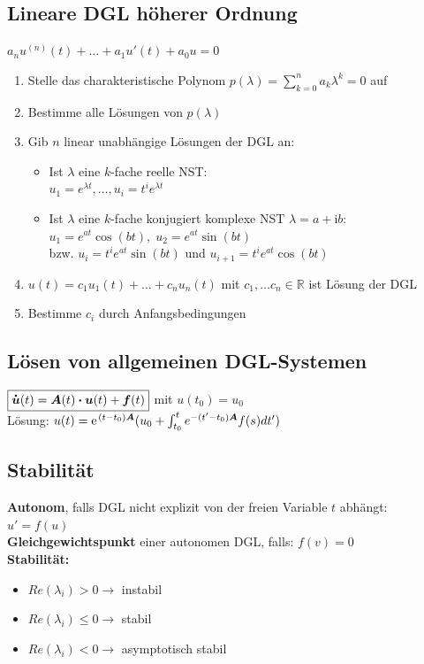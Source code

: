 \documentclass[6pt,a4paper]{scrartcl}
\newcommand{\ma}[1]{\ensuremath{\boldsymbol {#1}}}												%
\newcommand{\bdot}{\ensuremath{\boldsymbol \cdot}} 												%
\renewcommand{\vec}[1]{\ensuremath{\boldsymbol {#1}}}											%
\renewcommand*{\dot}[1]{\accentset{\mbox{\textrm{\large\bfseries .}} }{#1}}						%
\newcommand{\ra}[0]{\ensuremath{\rightarrow}} 									%
\renewcommand{\i}{\ensuremath{\mathrm{i}}}										%
\newcommand{\R}{\ensuremath{\mathbb R}}
\begin{document}
\begin{multicols*}{4}
\subsection{Lineare DGL höherer Ordnung}
$\boxed{a_nu^{(n)}(t) + \hdots + a_1u'(t)+a_0u = 0}$\\
\begin{enumerate}\itemsep0pt 
	\item Stelle das charakteristische Polynom $p(\lambda) = \sum^n_{k=0} a_k \lambda^k = 0$ auf
	\item Bestimme alle Lösungen von $p(\lambda)$
	\item Gib $n$ linear unabhängige Lösungen der DGL an:
	\begin{itemize}\itemsep0pt 
		\item 	Ist $ \lambda$ eine $k$-fache reelle NST:\\
$u_1 = e^{\lambda t}, \hdots, u_i = t^i e^{ \lambda t}$\\
		\item Ist $ \lambda$ eine $k$-fache konjugiert komplexe NST $\lambda = a + \i b$:\\
$u_1 = e^{at} \cos (bt),\; u_2 = e^{at} \sin (bt)$ \\
bzw. $u_i = t^i e^{at} \sin (bt)$ und $u_{i+1} =  t^i e^{at} \cos (bt)$
	\end{itemize}
	\item $u(t) = c_1 u_1 (t) + \ldots + c_n u_n (t)$ mit $c_1, \ldots c_n \in \R$ ist Lösung der DGL
	\item Bestimme $c_i$ durch Anfangsbedingungen
\end{enumerate}

\subsection{Lösen von allgemeinen DGL-Systemen}
$\boxed{\dot {\vec u}(t) = \ma A(t) \bdot \vec u(t) + \vec f(t)}$ mit $u(t_0) = u_0$\\
Lösung: $u(t) = \e^{(t-t_0)\ma A}(u_0 + \int_{t_0}^t e^{-(t'-t_0)\ma A}f(s)dt')$\\
\subsection{Stabilität}
\textbf{Autonom}, falls DGL nicht explizit von der freien Variable $t$ abhängt: $u'=f(u)$\\
\textbf{Gleichgewichtspunkt} einer autonomen DGL, falls: $f(v) = 0$\\
\textbf{Stabilität:}
\begin{itemize}\itemsep-1pt
	\item $Re(\lambda_i) > 0 \ra$ instabil
	\item $Re(\lambda_i) \le 0 \ra$ stabil
	\item $Re(\lambda_i) < 0 \ra$ asymptotisch stabil 
\end{itemize}


\end{multicols*}
\end{document}
